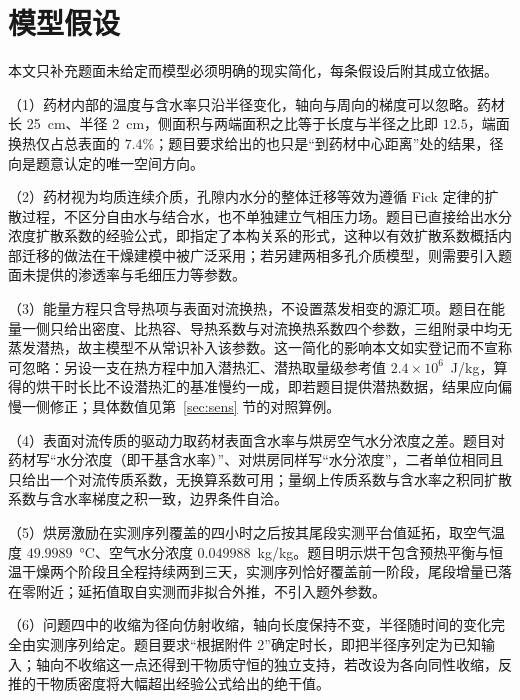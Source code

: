 \section{模型假设}

本文只补充题面未给定而模型必须明确的现实简化，每条假设后附其成立依据。

（1）药材内部的温度与含水率只沿半径变化，轴向与周向的梯度可以忽略。药材长 25~cm、半径 2~cm，侧面积与两端面积之比等于长度与半径之比即 $12.5$，端面换热仅占总表面的 $7.4\%$；题目要求给出的也只是“到药材中心距离”处的结果，径向是题意认定的唯一空间方向。

（2）药材视为均质连续介质，孔隙内水分的整体迁移等效为遵循 Fick 定律的扩散过程，不区分自由水与结合水，也不单独建立气相压力场。题目已直接给出水分浓度扩散系数的经验公式，即指定了本构关系的形式，这种以有效扩散系数概括内部迁移的做法在干燥建模中被广泛采用；若另建两相多孔介质模型，则需要引入题面未提供的渗透率与毛细压力等参数。

（3）能量方程只含导热项与表面对流换热，不设置蒸发相变的源汇项。题目在能量一侧只给出密度、比热容、导热系数与对流换热系数四个参数，三组附录中均无蒸发潜热，故主模型不从常识补入该参数。这一简化的影响本文如实登记而不宣称可忽略：另设一支在热方程中加入潜热汇、潜热取量级参考值 $2.4\times10^6$~J/kg，算得的烘干时长比不设潜热汇的基准慢约一成，即若题目提供潜热数据，结果应向偏慢一侧修正；具体数值见第~\ref{sec:sens} 节的对照算例。

（4）表面对流传质的驱动力取药材表面含水率与烘房空气水分浓度之差。题目对药材写“水分浓度（即干基含水率）”、对烘房同样写“水分浓度”，二者单位相同且只给出一个对流传质系数，无换算系数可用；量纲上传质系数与含水率之积同扩散系数与含水率梯度之积一致，边界条件自洽。

（5）烘房激励在实测序列覆盖的四小时之后按其尾段实测平台值延拓，取空气温度 $49.9989$~°C、空气水分浓度 $0.049988$~kg/kg。题目明示烘干包含预热平衡与恒温干燥两个阶段且全程持续两到三天，实测序列恰好覆盖前一阶段，尾段增量已落在零附近；延拓值取自实测而非拟合外推，不引入题外参数。

（6）问题四中的收缩为径向仿射收缩，轴向长度保持不变，半径随时间的变化完全由实测序列给定。题目要求“根据附件 2”确定时长，即把半径序列定为已知输入；轴向不收缩这一点还得到干物质守恒的独立支持，若改设为各向同性收缩，反推的干物质密度将大幅超出经验公式给出的绝干值。
